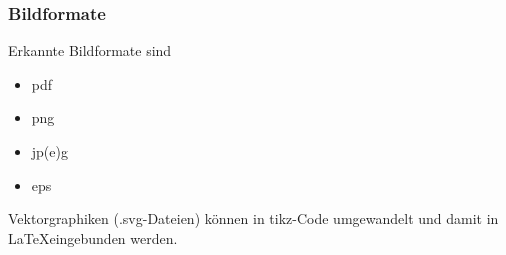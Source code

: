 



\begin{frame}[fragile]
  \frametitle{Bildformate}
  Erkannte Bildformate sind
  \begin{itemize}
    \item pdf
    \item png
    \item jp(e)g
    \item eps
  \end{itemize}
  Vektorgraphiken (.svg-Dateien) können in tikz-Code umgewandelt und damit in \LaTeX eingebunden werden.
  
\end{frame}



